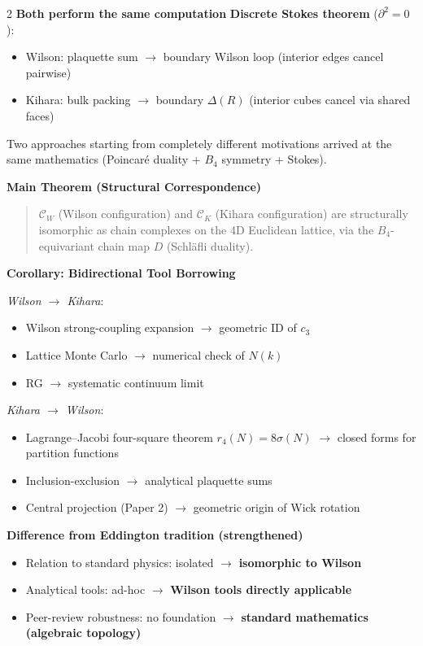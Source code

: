 \documentclass[9pt,a4paper]{article}
\begin{document}
\begin{multicols}{2}
\smallskip
\textbf{Both perform the same computation}\enspace
\textbf{Discrete Stokes theorem} ($\partial^2=0$):
\begin{itemize}[topsep=1pt]
\item Wilson: plaquette sum $\to$ boundary Wilson loop (interior edges cancel pairwise)
\item Kihara: bulk packing $\to$ boundary $\Delta(R)$ (interior cubes cancel via shared faces)
\end{itemize}
Two approaches starting from completely different motivations arrived at the same mathematics (Poincar\'e duality + $B_4$ symmetry + Stokes).

\columnbreak

\textbf{Main Theorem (Structural Correspondence)}\enspace
\begin{quote}\footnotesize
$\mathcal{C}_W$ (Wilson configuration) and $\mathcal{C}_K$ (Kihara configuration) are structurally isomorphic as chain complexes on the 4D Euclidean lattice, via the $B_4$-equivariant chain map $D$ (Schl\"afli duality).
\end{quote}

\smallskip
\textbf{Corollary: Bidirectional Tool Borrowing}\enspace

\textit{Wilson $\to$ Kihara}:
\begin{itemize}[topsep=1pt]
\item Wilson strong-coupling expansion $\to$ geometric ID of $c_3$
\item Lattice Monte Carlo $\to$ numerical check of $N(k)$
\item RG $\to$ systematic continuum limit
\end{itemize}

\textit{Kihara $\to$ Wilson}:
\begin{itemize}[topsep=1pt]
\item Lagrange--Jacobi four-square theorem $r_4(N) = 8\sigma(N)$ $\to$ closed forms for partition functions
\item Inclusion-exclusion $\to$ analytical plaquette sums
\item Central projection (Paper 2) $\to$ geometric origin of Wick rotation
\end{itemize}

\smallskip
\textbf{Difference from Eddington tradition (strengthened)}
\begin{itemize}[topsep=1pt]
\item Relation to standard physics: isolated $\to$ \textbf{isomorphic to Wilson}
\item Analytical tools: ad-hoc $\to$ \textbf{Wilson tools directly applicable}
\item Peer-review robustness: no foundation $\to$ \textbf{standard mathematics (algebraic topology)}
\end{itemize}


\end{multicols}
\end{document}

